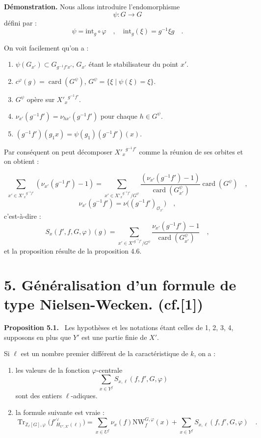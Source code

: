 \documentclass[11pt]{article}
\newenvironment{statement}[1]{\par\medskip\noindent\textbf{#1.}\ }{\par\medskip}
\providecommand{\Tr}{\operatorname{Tr}}
\providecommand{\Tr}{\operatorname{Tr}}
\providecommand{\Tr}{\operatorname{Tr}}
\providecommand{\Tr}{\operatorname{Tr}}
\providecommand{\bZ}{\mathbb Z}
\providecommand{\card}{\operatorname{card}}
\providecommand{\Tr}{\operatorname{Tr}}
\begin{document}
\medskip

\noindent
\textbf{Démonstration.} Nous allons introduire l'endomorphisme
\[
\psi : G \longrightarrow G
\]
défini par :
\[
\psi = \mathrm{int}_g \circ \varphi \quad , \quad \mathrm{int}_g(\xi) = g^{-1}\xi g \quad .
\]

On voit facilement qu'on a :
\begin{enumerate}
\item[i)] $\psi(G_{x'}) \subset G_{g^{-1}f'x'}$, $G_{x'}$ étant le stabilisateur du point $x'$.
\item[ii)] $c^\varphi(g) = \card(G^\psi)$, $G^\psi = \{ \xi \mid \psi(\xi) = \xi \}$.
\item[iii)] $G^\psi$ opère sur ${X'_x}^{g^{-1}f'}$.
\item[iv)] $\nu_{x'}(g^{-1}f') = \nu_{hx'}(g^{-1}f')$ pour chaque $h \in G^\psi$.
\item[v)] $(g^{-1}f')(g_1x) = \psi(g_1)(g^{-1}f')(x)$.
\end{enumerate}

Par conséquent on peut décomposer ${X'_x}^{g^{-1}f'}$ comme la réunion de ses orbites et on obtient :

\begin{equation}\tag{4.9.1}
\sum_{x' \in {X'_x}^{g^{-1}f'}} (\nu_{x'}(g^{-1}f') - 1) = \sum_{x' \in {X'_x}^{g^{-1}f'}/G^\psi} \frac{(\nu_{x'}(g^{-1}f') - 1)}{\card(G^\psi_{x'})} \card(G^\psi) \quad ,
\end{equation}
\[
\nu_{x'}(g^{-1}f')=\nu\bigl((g^{-1}f')_{\mathcal{O}_{x'}}\bigr) \quad ,
\]
c'est-à-dire :
\begin{equation}\tag{4.9.2}
S_x(f',f,G,\varphi)(g)=\sum_{x' \in {X'}^{g^{-1}f'}/G^\psi}
\frac{\nu_{x'}(g^{-1}f')-1}{\card(G^\psi_{x'})} \quad ,
\end{equation}
et la proposition résulte de la proposition 4.6.


\section*{5. Généralisation d'un formule de type Nielsen-Wecken. {\normalfont (cf.[1])}}

\begin{statement}{Proposition 5.1}
Les hypothèses et les notations étant celles de 1, 2, 3, 4, supposons en plus que $Y'$ est une partie finie de $X'$.

Si $\ell$ est un nombre premier différent de la caractéristique de $k$, on a :
\begin{enumerate}[label=\alph*)]
\item les valeurs de la fonction $\varphi$-centrale
\[
\sum_{x\in Y^f} S_{x,\ell}(f,f',G,\varphi)
\]
sont des entiers $\ell$-adiques.
\item la formule suivante est vraie :
\begin{equation}\tag{5.1.1}
\Tr_{\bZ_\ell[G],\varphi}\bigl(f'^\vee_{H_{U',X'}(\ell)}\bigr)
= \sum_{x\in U^f}\nu_x(f)\mathrm{NW}^{G,\varphi}_f(x)+\sum_{x\in Y^f}S_{x,\ell}(f,f',G,\varphi) \quad .
\end{equation}
\end{enumerate}
\end{statement}
\end{document}
